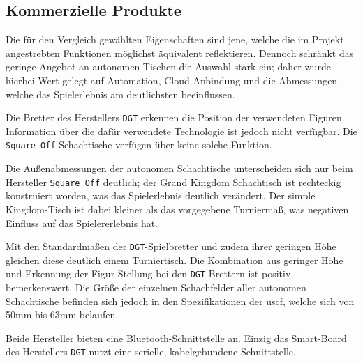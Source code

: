 \hypertarget{kommerzielle-produkte}{%
\subsection{Kommerzielle Produkte}\label{kommerzielle-produkte}}

Die für den Vergleich gewählten Eigenschaften sind jene, welche die im
Projekt angestrebten Funktionen möglichst äquivalent reflektieren.
Dennoch schränkt das geringe Angebot an autonomen Tischen die Auswahl
stark ein; daher wurde hierbei Wert gelegt auf Automation,
Cloud-Anbindung und die Abmessungen, welche das Spielerlebnis am
deutlichsten beeinflussen.

Die Bretter des Herstellers \passthrough{\lstinline!DGT!} erkennen die
Position der verwendeten Figuren. Information über die dafür verwendete
Technologie ist jedoch nicht verfügbar. Die
\passthrough{\lstinline!Square-Off!}-Schachtische verfügen über keine
solche Funktion.

Die Außenabmessungen der autonomen Schachtische unterscheiden sich nur
beim Hersteller \passthrough{\lstinline!Square Off!} deutlich; der Grand
Kingdom Schachtisch ist rechteckig konstruiert worden, was das
Spielerlebnis deutlich verändert. Der simple Kingdom-Tisch ist dabei
kleiner als das vorgegebene Turniermaß, was negativen Einfluss auf das
Spielererlebnis hat.

Mit den Standardmaßen der \passthrough{\lstinline!DGT!}-Spielbretter und
zudem ihrer geringen Höhe gleichen diese deutlich einem Turniertisch.
Die Kombination aus geringer Höhe und Erkennung der Figur-Stellung bei
den \passthrough{\lstinline!DGT!}-Brettern ist positiv bemerkenswert.
Die Größe der einzelnen Schachfelder aller autonomen Schachtische
befinden sich jedoch in den Spezifikationen der
\gls{uscf}\cite{officialuscfrules}, welche sich von 50mm bis 63mm
belaufen.

Beide Hersteller bieten eine Bluetooth-Schnittstelle an. Einzig das
Smart-Board des Herstellers \passthrough{\lstinline!DGT!} nutzt eine
serielle, kabelgebundene Schnittstelle.

\pagebreak

